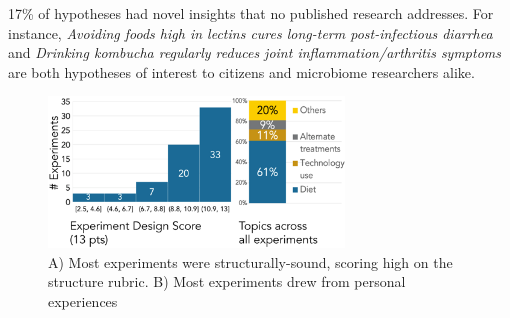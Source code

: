 \textit{}

17\% of hypotheses had novel insights that no published research addresses. For instance, \textit{Avoiding foods high in lectins cures long-term post-infectious diarrhea} and \textit{Drinking kombucha regularly reduces joint inflammation/arthritis symptoms} are both hypotheses of interest to citizens and microbiome researchers alike.


\begin{figure}[h]
\centering
  \includegraphics[width=0.7\textwidth]{figures/galileo/galileo-study2-1}
  \caption[Results: Most experiments were structurally-sound and drew from personal experiences]
{A) Most experiments were structurally-sound, scoring high on the structure rubric. B) Most experiments drew from personal experiences }
  \label{fig:galileo-result2}
\end{figure}


